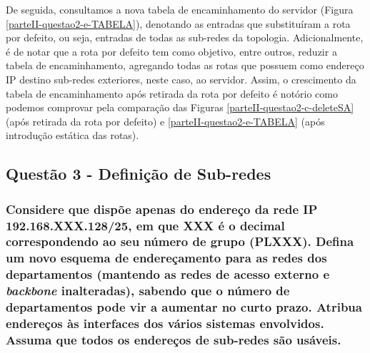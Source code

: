   
    \par De seguida, consultamos a nova tabela de encaminhamento do servidor (Figura \ref{parteII-questao2-e-TABELA}), denotando as entradas que substituíram a rota por defeito, ou seja, entradas de todas as sub-redes da topologia. Adicionalmente, é de notar que a rota por defeito tem como objetivo, entre outros, reduzir a tabela de encaminhamento, agregando todas as rotas que possuem como endereço IP destino sub-redes exteriores, neste caso, ao servidor. Assim, o crescimento da tabela de encaminhamento após retirada da rota por defeito é notório como podemos comprovar pela comparação das Figuras \ref{parteII-questao2-c-deleteSA} (após retirada da rota por defeito) e \ref{parteII-questao2-e-TABELA} (após introdução estática das rotas).
  
  
  
  
  
  
  
  
  
  
  
  
  
\newpage  
\subsection{Questão 3 -  Definição de Sub-redes}

\subsubsection{Considere que dispõe apenas do endereço da rede IP 192.168.XXX.128/25, em que XXX é o decimal correspondendo ao seu número de grupo (PLXXX). Defina um novo esquema de endereçamento para as redes dos departamentos (mantendo as redes de acesso externo e \textit{backbone} inalteradas), sabendo que o número de departamentos pode vir a aumentar no curto prazo. Atribua endereços às interfaces dos vários sistemas envolvidos. Assuma que todos os endereços de sub-redes são usáveis.}

    \par 
    
